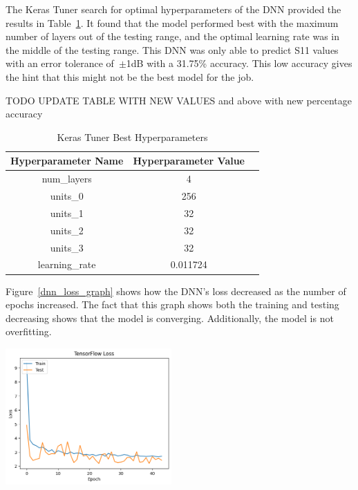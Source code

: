 \documentclass[lettersize,journal]{IEEEtran}
\newenvironment{Figure}
    {\par\medskip\noindent\minipage{\linewidth}}
    {\endminipage\par\medskip}
\begin{document}
The Keras Tuner search for optimal hyperparameters of the DNN provided the results in Table~\ref{keras_best_params}. It found that the model performed best with the maximum number of layers out of the testing range, and the optimal learning rate was in the middle of the testing range. This DNN was only able to predict S11 values with an error tolerance of~$\pm$1dB with a 31.75\% accuracy. This low accuracy gives the hint that this might not be the best model for the job.

TODO UPDATE TABLE WITH NEW VALUES and above with new percentage accuracy 

\begin{table}[h]
\caption{Keras Tuner Best Hyperparameters}
\begin{center}
\begin{tabular}{ |c|c|c| }
    \hline
    Hyperparameter Name & Hyperparameter Value \\ 
    \hline
    num\_layers & 4 \\  
    \hline
    units\_0 & 256 \\
    \hline
    units\_1 & 32 \\
    \hline
    units\_2 & 32 \\
    \hline
    units\_3 & 32 \\
    \hline
    learning\_rate & 0.011724 \\
    \hline
\end{tabular}
\end{center}
\label{keras_best_params}
\end{table}

Figure~\ref{dnn_loss_graph} shows how the DNN's loss decreased as the number of epochs increased. The fact that this graph shows both the training and testing decreasing shows that the model is converging. Additionally, the model is not overfitting. 

\begin{Figure}
    \centering
    \includegraphics[width=2.5in]{loss}
    \label{dnn_loss_graph}
\end{Figure}
\end{document}
